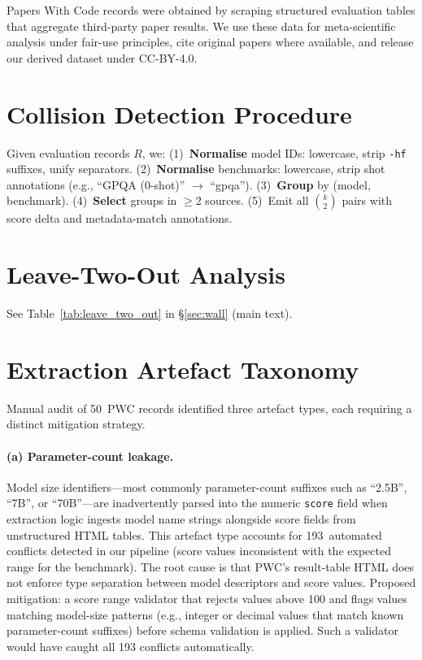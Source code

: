 \documentclass[11pt]{article}
\begin{document}
Papers With Code records were obtained by scraping structured
evaluation tables that aggregate third-party paper results. We
use these data for meta-scientific analysis under fair-use
principles, cite original papers where available, and release
our derived dataset under CC-BY-4.0.




\appendix

\section{Collision Detection Procedure}\label{app:collision_procedure}

Given evaluation records $R$, we:
(1)~\textbf{Normalise} model IDs: lowercase, strip \texttt{-hf}
suffixes, unify separators.
(2)~\textbf{Normalise} benchmarks: lowercase, strip shot
annotations (e.g., ``GPQA (0-shot)'' $\rightarrow$ ``gpqa'').
(3)~\textbf{Group} by (model, benchmark).
(4)~\textbf{Select} groups in $\geq$2 sources.
(5)~Emit all $\binom{k}{2}$ pairs with score delta and
metadata-match annotations.

\section{Leave-Two-Out Analysis}\label{app:leave_two_out}

See Table~\ref{tab:leave_two_out} in \S\ref{sec:wall} (main text).

\section{Extraction Artefact Taxonomy}\label{app:artefacts}

Manual audit of 50~PWC records identified three artefact types, each
requiring a distinct mitigation strategy.

\paragraph{(a) Parameter-count leakage.}
Model size identifiers---most commonly parameter-count suffixes
such as ``2.5B'', ``7B'', or ``70B''---are inadvertently parsed
into the numeric \texttt{score} field when extraction logic
ingests model name strings alongside score fields from
unstructured HTML tables. This artefact type accounts for
193~automated conflicts detected in our pipeline (score values
inconsistent with the expected range for the benchmark). The
root cause is that PWC's result-table HTML does not enforce
type separation between model descriptors and score values.
Proposed mitigation: a score range validator that rejects values
above 100 and flags values matching model-size patterns
(e.g., integer or decimal values that match known parameter-count
suffixes) before schema validation is applied. Such a validator
would have caught all 193 conflicts automatically.
\end{document}
